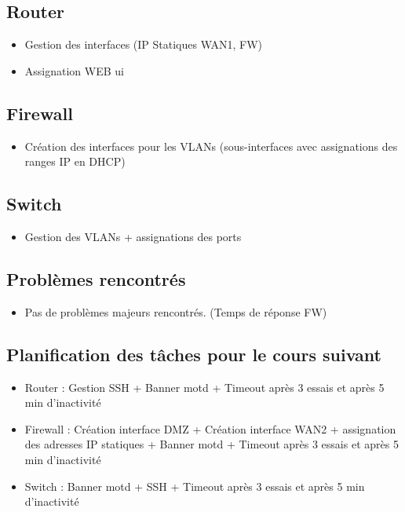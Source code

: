 \documentclass{article}
\begin{document}
\subsection{Router}

\begin{itemize}
\item Gestion des interfaces (IP Statiques WAN1, FW)
\item Assignation WEB ui
\end{itemize} 


\subsection{Firewall}

\begin{itemize}
\item Création des interfaces pour les VLANs (sous-interfaces avec assignations des ranges IP en DHCP)
\end{itemize} 
\subsection{Switch}

\begin{itemize}
\item Gestion des VLANs + assignations des ports
\end{itemize} 
\subsection{Problèmes rencontrés}
\begin{itemize}
\item Pas de problèmes majeurs rencontrés. (Temps de réponse FW)
\end{itemize} 
\subsection{Planification des tâches pour le cours suivant}
\begin{itemize}
\item Router : Gestion SSH + Banner motd + Timeout après 3 essais et après 5 min d'inactivité
\item Firewall : Création interface DMZ + Création interface WAN2 + assignation des adresses IP statiques + Banner motd + Timeout après 3 essais et après 5 min d'inactivité
\item Switch : Banner motd + SSH + Timeout après 3 essais et après 5 min d'inactivité
\end{itemize} 
\newpage
\end{document}
